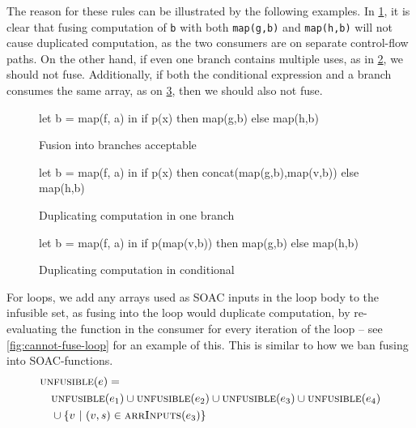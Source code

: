 \begin{description}[style=nextline]
The reason for these rules can be illustrated by the following
examples.  In \cref{fig:fuse-across-if-ok}, it is clear that fusing
computation of \texttt{b} with both \texttt{map(g,b)} and
\texttt{map(h,b)} will not cause duplicated computation, as the two
consumers are on separate control-flow paths.  On the other hand, if
even one branch contains multiple uses, as in
\cref{fig:fuse-across-if-bad}, we should not fuse.  Additionally, if
both the conditional expression and a branch consumes the same array,
as on \cref{fig:fuse-across-if-bad-condition}, then we should also not
fuse.

\begin{figure}
\begin{center}
\begin{bcolorcode}
let b = map(f, a) in
if p(x) then map(g,b)
        else map(h,b)
\end{bcolorcode}
\end{center}
\caption{Fusion into branches acceptable}
\label{fig:fuse-across-if-ok}
\end{figure}

\begin{figure}
\begin{center}
\begin{bcolorcode}
let b = map(f, a) in
if p(x) then concat(map(g,b),map(v,b))
        else map(h,b)
\end{bcolorcode}
\end{center}
\caption{Duplicating computation in one branch}
\label{fig:fuse-across-if-bad}
\end{figure}

\begin{figure}
\begin{center}
\begin{bcolorcode}
let b = map(f, a) in
if p(map(v,b)) then map(g,b)
               else map(h,b)
\end{bcolorcode}
\end{center}
\caption{Duplicating computation in conditional}
\label{fig:fuse-across-if-bad-condition}
\end{figure}

\item[Case $e \equiv \texttt{loop ($p$ = $e_{1}$) = for $v$ < $e_{2}$ do $e_{3}$ in $e_{4}$}$]

  For loops, we add any arrays used as SOAC inputs in the loop body to
  the infusible set, as fusing into the loop would duplicate
  computation, by re-evaluating the function in the consumer for every
  iteration of the loop -- see \cref{fig:cannot-fuse-loop} for an
  example of this.  This is similar to how we ban fusing into
  SOAC-functions.
\begin{align*}
  & \textsc{unfusible}(e) =\\
  & \quad \textsc{unfusible}(e_{1}) \cup \textsc{unfusible}(e_{2}) \cup \textsc{unfusible}(e_{3}) \cup \textsc{unfusible}(e_{4}) \\
  & \quad \cup \{ v\ |\ (v,s) \in \textsc{arrInputs}(e_{3}) \}
\end{align*}


\end{description}
